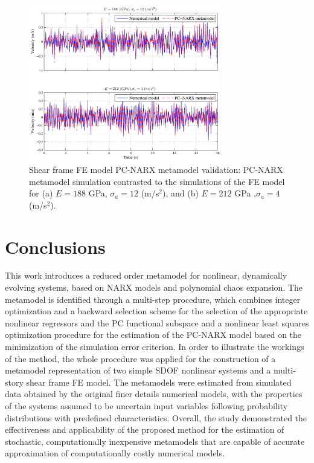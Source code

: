 \documentclass[preprint,3p,review,times,11pt]{elsarticle}
\begin{document}
\begin{figure}[t!]
\begin{center}
\includegraphics[width = 0.75\textwidth]{figs/SF_randexci_val.pdf}
\caption{Shear frame FE model PC-NARX metamodel validation: PC-NARX metamodel simulation contrasted to the simulations of the FE model for (a) $ E = 188$ GPa, $\sigma_a = 12$ (m/s$^2$), and (b) $ E = 212$ GPa ,$\sigma_a = 4$ (m/s$^2$). 
\label{fig:SF_validation}}
\end{center}
\end{figure}

\section{Conclusions}\label{sec:conclusions}
This work introduces a reduced order metamodel for nonlinear, dynamically evolving systems, based on NARX models and polynomial chaos expansion. The metamodel is identified through a multi-step procedure, which combines integer optimization and a backward selection scheme for the selection of the appropriate nonlinear regressors and the PC functional subspace and a nonlinear least squares optimization procedure for the estimation of the PC-NARX model based on the minimization of the simulation error criterion. In order to illustrate the workings of the method, the whole procedure was applied for the construction of a metamodel representation of two simple SDOF nonlinear systems and a multi-story shear frame FE model. The metamodels were estimated from simulated data obtained by the original finer details numerical models, with the properties of the systems assumed to be uncertain input variables following probability distributions with predefined characteristics. Overall, the study demonstrated the effectiveness and applicability of the proposed method for the estimation of stochastic, computationally inexpensive metamodels that are capable of accurate approximation of computationally costly numerical models.
\end{document}

